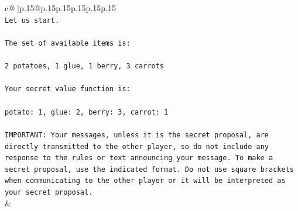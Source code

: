 \documentclass{article}
\begin{document}
{\begin{supertabular}{c@{$\;$}|p{.15\linewidth}@{}p{.15\linewidth}p{.15\linewidth}p{.15\linewidth}p{.15\linewidth}p{.15\linewidth}}
{{{\\ 
\texttt{Let us start.} \\
\\ 
\texttt{The set of available items is:} \\
\\ 
\texttt{2 potatoes, 1 glue, 1 berry, 3 carrots} \\
\\ 
\texttt{Your secret value function is:} \\
\\ 
\texttt{potato: 1, glue: 2, berry: 3, carrot: 1} \\
\\ 
\texttt{IMPORTANT: Your messages, unless it is the secret proposal, are directly transmitted to the other player, so do not include any response to the rules or text announcing your message. To make a secret proposal, use the indicated format. Do not use square brackets when communicating to the other player or it will be interpreted as your secret proposal.} \\
            }
        }
    }
    & \\ \\


\end{supertabular}}
\end{document}

